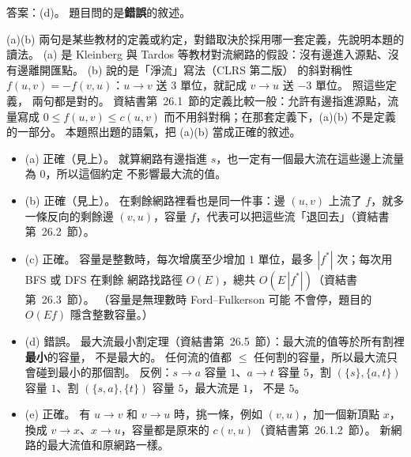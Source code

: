 \begin{pastsoln}
答案：(d)。 題目問的是\textbf{錯誤}的敘述。

(a)(b) 兩句是某些教材的定義或約定，對錯取決於採用哪一套定義，先說明本題的讀法。 (a) 是 Kleinberg 與
Tardos 等教材對流網路的假設：沒有邊進入源點、沒有邊離開匯點。 (b) 說的是「淨流」寫法（CLRS 第二版）
的斜對稱性 $f(u, v) = -f(v, u)$：$u \to v$ 送 $3$ 單位，就記成 $v \to u$ 送 $-3$ 單位。 照這些定義，
兩句都是對的。 資結書第~26.1~節的定義比較一般：允許有邊指進源點，流量寫成 $0 \le f(u, v) \le c(u, v)$
而不用斜對稱；在那套定義下，(a)(b) 不是定義的一部分。 本題照出題的語氣，把 (a)(b) 當成正確的敘述。

\begin{itemize}
\item (a) 正確（見上）。 就算網路有邊指進 $s$，也一定有一個最大流在這些邊上流量為 $0$，所以這個約定
不影響最大流的值。
\item (b) 正確（見上）。 在剩餘網路裡看也是同一件事：邊 $(u, v)$ 上流了 $f$，就多一條反向的剩餘邊
$(v, u)$，容量 $f$，代表可以把這些流「退回去」（資結書第~26.2~節）。
\item (c) 正確。 容量是整數時，每次增廣至少增加 $1$ 單位，最多 $|f^*|$ 次；每次用 BFS 或 DFS 在剩餘
網路找路徑 $O(E)$，總共 $O(E\,|f^*|)$（資結書第~26.3~節）。 （容量是無理數時 Ford--Fulkerson 可能
不會停，題目的 $O(Ef)$ 隱含整數容量。）
\item (d) 錯誤。 最大流最小割定理（資結書第~26.5~節）：最大流的值等於所有割裡\textbf{最小}的容量，
不是最大的。 任何流的值都 $\le$ 任何割的容量，所以最大流只會碰到最小的那個割。 反例：$s \to a$ 容量
$1$、$a \to t$ 容量 $5$，割 $(\{s\}, \{a, t\})$ 容量 $1$、割 $(\{s, a\}, \{t\})$ 容量 $5$，最大流是 $1$，
不是 $5$。
\item (e) 正確。 有 $u \to v$ 和 $v \to u$ 時，挑一條，例如 $(v, u)$，加一個新頂點 $x$，換成
$v \to x$、$x \to u$，容量都是原來的 $c(v, u)$（資結書第~26.1.2~節）。 新網路的最大流值和原網路一樣。
\end{itemize}
\end{pastsoln}
